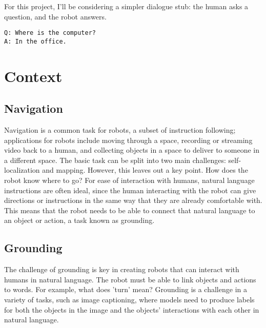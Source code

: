 \documentclass{article}
\begin{document}
For this project, I'll be considering a simpler dialogue stub: the human asks a question, and the robot answers. 
\begin{verbatim}
Q: Where is the computer?
A: In the office. 
\end{verbatim}

\section{Context}
\subsection{Navigation}
Navigation is a common task for robots, a subset of instruction following; applications for robots include moving through a space, recording or streaming video back to a human, and collecting objects in a space to deliver to someone in a different space. The basic task can be split into two main challenges: self-localization and mapping\cite{Wallgrun:2007zr}. However, this leaves out a key point. How does the robot know where to go? For ease of interaction with humans, natural language instructions are often ideal, since the human interacting with the robot can give directions or instructions in the same way that they are already comfortable with. This means that the robot needs to be able to connect that natural language to an object or action, a task known as grounding. 


\subsection{Grounding}
The challenge of grounding is key in creating robots that can interact with humans in natural language. The robot must be able to link objects and actions to words. For example, what does 'turn' mean? Grounding is a challenge in a variety of tasks, such as image captioning, where models need to produce labels for both the objects in the image and the objects' interactions with each other in natural language\cite{karpathy2014captioning}.
\end{document}
